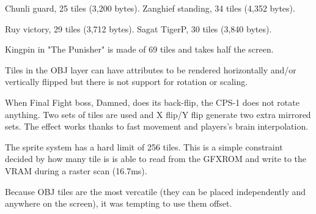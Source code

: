 \begin{minipage}[t]{0.453\linewidth}
\end{minipage}%
\hfill%
\begin{minipage}[t]{0.53\linewidth}
\end{minipage}



Chunli guard, 25 tiles (3,200 bytes). Zanghief standing, 34 tiles (4,352 bytes). 

\begin{minipage}[t]{0.3\linewidth}
\end{minipage}%
\hfill%
\begin{minipage}[t]{0.53\linewidth}
\end{minipage}

Ruy victory, 29 tiles (3,712 bytes). Sagat TigerP, 30 tiles (3,840 bytes). 




Kingpin in "The Punisher" is made of 69 tiles and takes half the screen.


Tiles in the OBJ layer can have attributes to be rendered horizontally and/or vertically flipped but there is not support for rotation or scaling.

\begin{minipage}[t]{0.535\linewidth}
\end{minipage}%
\hfill%
\begin{minipage}[t]{0.445\linewidth}
\end{minipage}

 When Final Fight boss, Damned, does its back-flip, the CPS-1 does not rotate anything. Two sets of tiles are used and X flip/Y flip generate two extra mirrored sets. The effect works thanks to fast movement and players's brain interpolation.


\pagebreak

The sprite system has a hard limit of 256 tiles. This is a simple constraint decided by how many tile is is able to read from the GFXROM and write to the VRAM during a raster scan (16.7ms).

Because OBJ tiles are the most vercatile (they can be placed independently and anywhere on the screen), it was tempting to use them offset.

